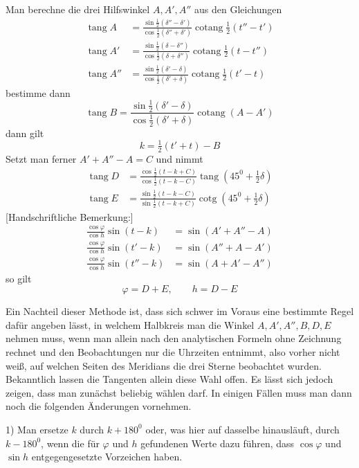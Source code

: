 Man berechne die drei Hilfswinkel $A,A',A''$ aus den Gleichungen
%
\[
\begin{aligned}
\operatorname{tang}A&=\frac{\sin\frac12(\delta''-\delta')}{\cos\frac12(\delta''+\delta')}\operatorname{cotang}\tfrac12(t''-t')\\
\operatorname{tang}A'&=\frac{\sin\frac12(\delta-\delta'')}{\cos\frac12(\delta+\delta'')}\operatorname{cotang}\tfrac12(t-t'')\\
\operatorname{tang}A''&=\frac{\sin\frac12(\delta'-\delta)}{\cos\frac12(\delta'+\delta)}\operatorname{cotang}\tfrac12(t'-t)
\end{aligned}
\]
bestimme dann
\[
\operatorname{tang}B=\frac{\sin\frac12(\delta'-\delta)}{\cos\frac12(\delta'+\delta)}\operatorname{cotang}(A-A')
\]
dann gilt
\[
k=\tfrac12(t'+t)-B
\]
Setzt man ferner $A'+A''-A=C$ und nimmt
\[
\begin{aligned}
\operatorname{tang}D&=\frac{\cos\frac12(t-k+C)}{\cos\frac12(t-k-C)}\operatorname{tang}(45^0+\tfrac12\delta)\\
\operatorname{tang}E&=\frac{\sin\frac12(t-k-C)}{\sin\frac12(t-k+C)}\operatorname{cotg}(45^0+\tfrac12\delta)
\end{aligned}
\]
\expandafter\def\csname HistoricalNoteText6\endcsname{[Handschriftliche Bemerkung:]
\[
\begin{aligned}
\frac{\cos\varphi}{\cos h}\sin(t-k)&=\sin(A'+A''-A)\\
\frac{\cos\varphi}{\cos h}\sin(t'-k)&=\sin(A''+A-A')\\
\frac{\cos\varphi}{\cos h}\sin(t''-k)&=\sin(A+A'-A'')
\end{aligned}
\]}
so gilt
\[
\varphi=D+E,\qquad h=D-E
\]

Ein Nachteil dieser Methode ist, dass sich schwer im Voraus eine bestimmte Regel dafür angeben lässt, in welchem Halbkreis man die Winkel $A,A',A'',B,D,E$ nehmen muss, wenn man allein nach den analytischen Formeln ohne Zeichnung rechnet und den Beobachtungen nur die Uhrzeiten entnimmt, also vorher nicht weiß, auf welchen Seiten des Meridians die drei Sterne beobachtet wurden. Bekanntlich lassen die Tangenten allein diese Wahl offen. Es lässt sich jedoch zeigen, dass man zunächst beliebig wählen darf. In einigen Fällen muss man dann noch die folgenden Änderungen vornehmen.

1) Man ersetze $k$ durch $k+180^0$ oder, was hier auf dasselbe hinausläuft, durch $k-180^0$, wenn die für $\varphi$ und $h$ gefundenen Werte dazu führen, dass $\cos\varphi$ und $\sin h$ entgegengesetzte Vorzeichen haben.
%


